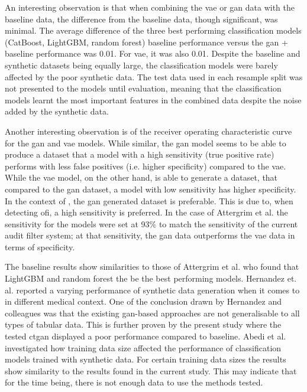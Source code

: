 \documentclass[12pt, a4paper]{article}
\begin{document}
An interesting observation is that when combining the \acrshort{vae} or \acrshort{gan} data with the baseline data, the difference from the baseline data, though significant, was minimal. The average difference of the three best performing classification models (CatBoost, LightGBM, random forest) baseline performance versus the \acrshort{gan} + baseline performance was 0.01. For \acrshort{vae}, it was also 0.01. Despite the baseline and synthetic datasets being equally large, the classification models were barely affected by the poor synthetic data. The test data used in each resample split was not presented to the models until evaluation, meaning that the classification models learnt the most important features in the combined data despite the noise added by the synthetic data.

Another interesting observation is of the receiver operating characteristic curve for the \acrshort{gan} and \acrshort{vae} models. While similar, the \acrshort{gan} model seems to be able to produce a dataset that a model with a high sensitivity (true positive rate) performs with less false positives (i.e. higher specificity) compared to the \acrshort{vae}. While the \acrshort{vae} model, on the other hand, is able to generate a dataset, that compared to the \acrshort{gan} dataset, a model with low sensitivity has higher specificity. In the context of , the \acrshort{gan} generated dataset is preferable. This is due to, when detecting \acrshort{ofi}, a high sensitivity is preferred. In the case of Attergrim et al. \cite{attergrim_predicting_2023} the sensitivity for the models were set at 93\% to match the sensitivity of the current audit filter system; at that sensitivity, the \acrshort{gan} data outperforms the \acrshort{vae} data in terms of specificity.

The baseline results show similarities to those of Attergrim et al. \cite{attergrim_predicting_2023} who found that LightGBM and random forest the be the best performing models. Hernandez et. al. \cite{hernandez_synthetic_2022} reported a varying performance of synthetic data generation when it comes to  in different medical context. One of the conclusion drawn by Hernandez and colleagues was that the existing \acrshort{gan}-based approaches are not generalisable to all types of tabular data. This is further proven by the present study where the tested \acrshort{ctgan} displayed a poor performance compared to baseline. Abedi et al. \cite{abedi_gan-based_2022} investigated how training data size affected the performance of classification models trained with synthetic data. For certain training data sizes the results show similarity to the results found in the current study. This may indicate that for the time being, there is not enough data to use the methods tested.
\end{document}
